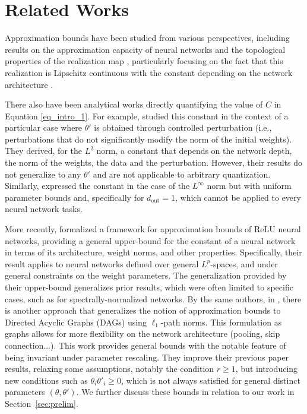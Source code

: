 \section{Related Works}
\label{sec:related_works}
	
	Approximation bounds have been studied from various perspectives, including results on the approximation capacity of neural networks \cite{devore2021neural} \cite{ding2019universal} \cite{csaji2001approximation} \cite{barron1993universal} and the topological properties of the realization map \cite{petersen2021topological}, particularly focusing on the fact that this realization is Lipschitz continuous with the constant depending on the network architecture \cite{petersen2021topological} \cite{devore2021neural}.
	
	There also have been analytical works directly quantifying the value of \( C \) in Equation \eqref{eq_intro_1}. For example, \cite{neyshabur2017pac} studied this constant in the context of a particular case where \( \theta' \) is obtained through controlled perturbation (i.e., perturbations that do not significantly modify the norm of the initial weights). They derived, for the \( L^2 \) norm, a constant that depends on the network depth, the norm of the weights, the data and the perturbation. However, their results do not generalize to any \( \theta' \) and  are not applicable to arbitrary quantization. Similarly, \cite{berner2020analysis} expressed the constant in the case of the \( L^\infty \) norm but with uniform parameter bounds and, specifically for \( d_{\text{out}} = 1 \), which cannot be applied to every neural network tasks.
	
	More recently, \cite{gonon2023approximation} formalized a framework for approximation bounds of ReLU neural networks, providing a general upper-bound for the constant of a neural network in terms of its architecture, weight norms, and other properties. Specifically, their result applies to neural networks defined over general \(L^p\)-spaces, and under general constraints on the weight parameters. The generalization provided by their upper-bound generalizes prior results, which were often limited to specific cases, such as \cite{neyshabur2017pac} for spectrally-normalized networks.
	By the same authors, in \cite{gonon2024path}, there is another approach that generalizes the notion of approximation bounds to Directed Acyclic Graphs (DAGs) using \( \ell_1 \)-path norms. This formulation as graphs allows for more flexibility on the network architecture (pooling, skip connection...). This work provides general bounds with the notable feature of being invariant under parameter rescaling. They improve their previous paper results, relaxing some assumptions, notably the condition \( r \geq 1 \), but introducing new conditions such as \( \theta_i \theta'_i \geq 0 \), which is not always satisfied for general distinct parameters $(\theta,\theta')$. We further discuss these bounds  in relation to our work in Section~\ref{sec:prelim}.
	
